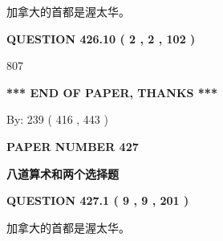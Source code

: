 \documentclass{ctexart}
\begin{document}
  
 
 
\noindent{}
 
 
加拿大的首都是渥太华。
 
 
 
 
  
\vspace{0.2in}
  
{\textbf{\Large{QUESTION
426.10 
 ( 2 , 2 , 102 )
}}}
  
  
 
 
\noindent{}

807
 
 
   
   
 \vspace{0.2in}
 
   
   
   
   
\vspace{1.0in} 
{\textbf{\large{ *** END OF PAPER, THANKS *** }}} 
   
   
\hspace{1.0in} By: 
 239 ( 416 ,  443 )
   
   
   
   
\newpage 
\setcounter{page}{ 
   427001 } 
   
   
   
   
 {\textbf{ \Large{ PAPER NUMBER  427  }}}
   
   
\vspace{0.2in}
   
   
   
   
   
   
 \vspace{0.2in}
{\LARGE {\textbf{ 八道算术和两个选择题}}}
   
   
  
\vspace{0.2in}
  
{\textbf{\Large{QUESTION
427.1 
 ( 9 , 9 , 201 )
}}}
  
  
 
 
\noindent{}
 
 
加拿大的首都是渥太华。
 
\end{document}
